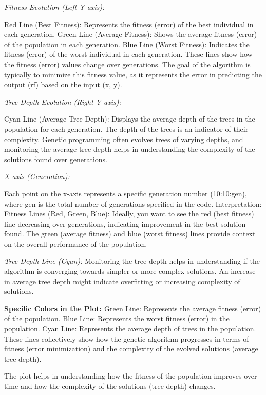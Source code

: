 \documentclass[
  letterpaper,
  DIV=11,
  numbers=noendperiod]{scrartcl}
\begin{document}
\emph{Fitness Evolution (Left Y-axis):}

Red Line (Best Fitness): Represents the fitness (error) of the best
individual in each generation. Green Line (Average Fitness): Shows the
average fitness (error) of the population in each generation. Blue Line
(Worst Fitness): Indicates the fitness (error) of the worst individual
in each generation. These lines show how the fitness (error) values
change over generations. The goal of the algorithm is typically to
minimize this fitness value, as it represents the error in predicting
the output (rf) based on the input (x, y).

\emph{Tree Depth Evolution (Right Y-axis):}

Cyan Line (Average Tree Depth): Displays the average depth of the trees
in the population for each generation. The depth of the trees is an
indicator of their complexity. Genetic programming often evolves trees
of varying depths, and monitoring the average tree depth helps in
understanding the complexity of the solutions found over generations.

\emph{X-axis (Generation):}

Each point on the x-axis represents a specific generation number
(10:10:gen), where gen is the total number of generations specified in
the code. Interpretation: Fitness Lines (Red, Green, Blue): Ideally, you
want to see the red (best fitness) line decreasing over generations,
indicating improvement in the best solution found. The green (average
fitness) and blue (worst fitness) lines provide context on the overall
performance of the population.

\emph{Tree Depth Line (Cyan):} Monitoring the tree depth helps in
understanding if the algorithm is converging towards simpler or more
complex solutions. An increase in average tree depth might indicate
overfitting or increasing complexity of solutions.

\textbf{Specific Colors in the Plot:} Green Line: Represents the average
fitness (error) of the population. Blue Line: Represents the worst
fitness (error) in the population. Cyan Line: Represents the average
depth of trees in the population. These lines collectively show how the
genetic algorithm progresses in terms of fitness (error minimization)
and the complexity of the evolved solutions (average tree depth).

The plot helps in understanding how the fitness of the population
improves over time and how the complexity of the solutions (tree depth)
changes.
\end{document}
